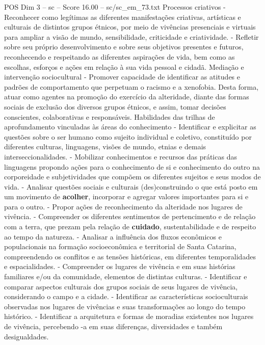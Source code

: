 \begin{textsample}{POS Dim 3 – sc – Score 16.00 – sc/sc\_em\_73.txt}
Processos criativos - Reconhecer como legítimas as diferentes manifestações criativas, artísticas e culturais de distintos grupos étnicos, por meio de vivências presenciais e virtuais para ampliar a visão de mundo, sensibilidade, criticidade e criatividade. - Refletir sobre seu próprio desenvolvimento e sobre seus objetivos presentes e futuros, reconhecendo e respeitando as diferentes aspirações de vida, bem como as escolhas, esforços e ações em relação à sua vida pessoal e cidadã.
Mediação e intervenção sociocultural - Promover capacidade de identificar as atitudes e padrões de comportamento que perpetuam o racismo e a xenofobia.
Desta forma, atuar como agentes na promoção do exercício da alteridade, diante das formas sociais de exclusão dos diversos grupos étnicos, e assim, tomar decisões conscientes, colaborativas e responsáveis.
Habilidades das trilhas de aprofundamento vinculadas às áreas do conhecimento - Identificar e explicitar as questões sobre o ser humano como sujeito individual e coletivo, constituído por diferentes culturas, linguagens, visões de mundo, etnias e demais interseccionalidades. - Mobilizar conhecimentos e recursos das práticas das linguagens propondo ações para o conhecimento de si e conhecimento do outro na corporeidade e subjetividades que compõem os diferentes sujeitos e seus modos de vida. - Analisar questões sociais e culturais (des)construindo o que está posto em um movimento de \textbf{acolher}, incorporar e agregar valores importantes para si e para o outro. - Propor ações de reconhecimento da alteridade nos lugares de vivência. - Compreender os diferentes sentimentos de pertencimento e de relação com a terra, que prezam pela relação de \textbf{cuidado}, sustentabilidade e de respeito ao tempo da natureza. - Analisar a influência dos fluxos econômicos e populacionais na formação socioeconômica e territorial de Santa Catarina, compreendendo os conflitos e as tensões históricas, em diferentes temporalidades e espacialidades. - Compreender os lugares de vivência e em suas histórias familiares e/ou da comunidade, elementos de distintas culturas. - Identificar e comparar aspectos culturais dos grupos sociais de seus lugares de vivência, considerando o campo e a cidade. - Identificar as características socioculturais observadas nos lugares de vivências e suas transformações ao longo do tempo histórico. - Identificar a arquitetura e formas de moradias existentes nos lugares de vivência, percebendo -a em suas diferenças, diversidades e também desigualdades.

\end{textsample}
